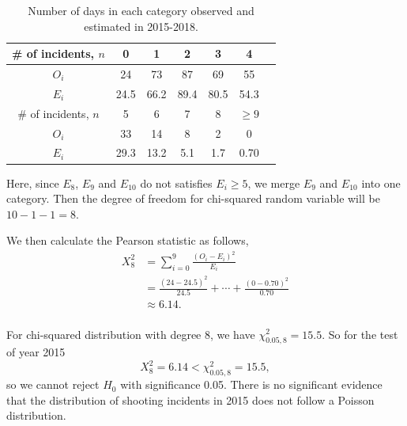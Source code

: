\documentclass[11pt,a4paper,english]{article}
\begin{document}
\begin{table}[htbp]
    \centering
	\begin{tabular}{c|cccccc}
		\hline
        \# of incidents, $n$ & 0 & 1 & 2 & 3 & 4  \\
		\hline
		$O_{i}$ & 24 & 73 & 87 & 69 & 55 \\
		\hline
		$E_{i}$ & 24.5 & 66.2 & 89.4 & 80.5 & 54.3 \\ 
		\hline
		\hline
		\# of incidents, $n$ & 5 & 6 & 7 & 8 & $\geq 9$  \\
		\hline
		$O_{i}$ & 33 & 14 & 8 & 2 & 0\\
		\hline
		$E_{i}$ & 29.3 & 13.2 & 5.1 & 1.7 & 0.70\\ 
		\hline 
    \end{tabular}
	\caption{Number of days in each category observed and estimated in 2015-2018.}
\end{table}

Here, since $E_{8}$, $E_{9}$ and $E_{10}$ do not satisfies $E_{i} \geq 5$, we merge $E_{9}$ and $E_{10}$ into one category. Then the degree of freedom for chi-squared random variable will be $10-1-1 = 8$.

We then calculate the Pearson statistic as follows,
\begin{align*}
	X_{8}^{2} &= \sum_{i = 0}^{9}\frac{(O_{i}-E_{i})^{2}}{E_{i}}\\
	&= \frac{(24-24.5)^{2}}{24.5}+\cdots+\frac{(0-0.70)^{2}}{0.70}\\
	&\approx 6.14.\\
\end{align*}

For chi-squared distribution with degree 8, we have $\chi_{0.05,8}^{2} = 15.5$. So for the test of year 2015
\begin{equation*}
	X_{8}^{2} = 6.14 < \chi_{0.05,8}^{2} = 15.5,
\end{equation*}
so we cannot reject $H_{0}$ with significance 0.05.
There is no significant evidence that the distribution of shooting incidents in 2015 does not follow a Poisson distribution.
\end{document}
